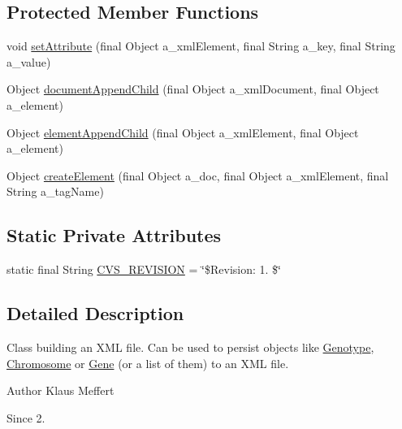 \subsection*{Protected Member Functions}
\begin{DoxyCompactItemize}
\item 
void \hyperlink{classorg_1_1jgap_1_1xml_1_1_x_m_l_document_builder_a32d70e65f3e8effac178585888961b0c}{set\-Attribute} (final Object a\-\_\-xml\-Element, final String a\-\_\-key, final String a\-\_\-value)
\item 
Object \hyperlink{classorg_1_1jgap_1_1xml_1_1_x_m_l_document_builder_a3c9b61b1ce937d458eabe2cca2aed05a}{document\-Append\-Child} (final Object a\-\_\-xml\-Document, final Object a\-\_\-element)
\item 
Object \hyperlink{classorg_1_1jgap_1_1xml_1_1_x_m_l_document_builder_a068f726b57ff7d5ff6439533d81536a0}{element\-Append\-Child} (final Object a\-\_\-xml\-Element, final Object a\-\_\-element)
\item 
Object \hyperlink{classorg_1_1jgap_1_1xml_1_1_x_m_l_document_builder_a55801ebeb86a7b4e2b37629823a46705}{create\-Element} (final Object a\-\_\-doc, final Object a\-\_\-xml\-Element, final String a\-\_\-tag\-Name)
\end{DoxyCompactItemize}
\subsection*{Static Private Attributes}
\begin{DoxyCompactItemize}
\item 
static final String \hyperlink{classorg_1_1jgap_1_1xml_1_1_x_m_l_document_builder_a1174960a805366ca3ccd7fe5e3fb92f7}{C\-V\-S\-\_\-\-R\-E\-V\-I\-S\-I\-O\-N} = \char`\"{}\$Revision\-: 1. \$\char`\"{}
\end{DoxyCompactItemize}


\subsection{Detailed Description}
Class building an X\-M\-L file. Can be used to persist objects like \hyperlink{classorg_1_1jgap_1_1_genotype}{Genotype}, \hyperlink{classorg_1_1jgap_1_1_chromosome}{Chromosome} or \hyperlink{interfaceorg_1_1jgap_1_1_gene}{Gene} (or a list of them) to an X\-M\-L file.

\begin{DoxyAuthor}{Author}
Klaus Meffert 
\end{DoxyAuthor}
\begin{DoxySince}{Since}
2. 
\end{DoxySince}


